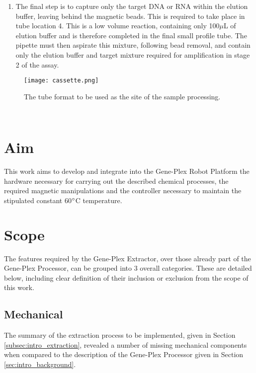 \begin{enumerate}
	\item The final step is to capture only the target DNA or RNA within the elution buffer, leaving behind the magnetic beads. This is required to take place in tube location 4. This is a low volume reaction, containing only 100$\mu$L of elution buffer and is therefore completed in the final small profile tube. The pipette must then aspirate this mixture, following bead removal, and contain only the elution buffer and target mixture required for amplification in stage 2 of the assay.
\end{enumerate}

\begin{figure}[!htb]
	\centering
	\texttt{[image: cassette.png]}
	\caption[Extraction cassette tubes.]{The tube format to be used as the site of the sample processing.}
	\label{fig:cassette}
\end{figure} 
\FloatBarrier

\section{Aim}
\label{sec:intro_aim}
This work aims to develop and integrate into the Gene-Plex Robot Platform the hardware necessary for carrying out the described chemical processes, the required magnetic manipulations and the controller necessary to maintain the stipulated constant 60$\degree$C temperature.

\section{Scope}
\label{sec:intro_scope}
The features required by the Gene-Plex Extractor, over those already part of the Gene-Plex Processor, can be grouped into 3 overall categories. These are detailed below, including clear definition of their inclusion or exclusion from the scope of this work.

\subsection{Mechanical}
\label{sec:intro_mechanical}
The summary of the extraction process to be implemented, given in Section \ref{subsec:intro_extraction}, revealed a number of missing mechanical components when compared to the description of the Gene-Plex Processor given in Section \ref{sec:intro_background}. 

